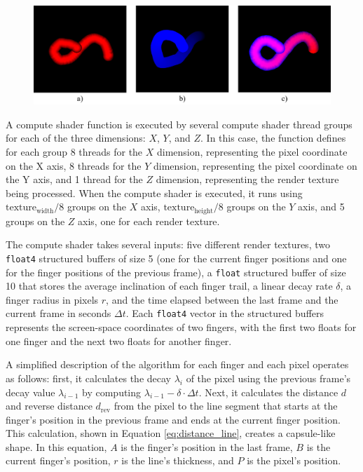         \begin{figure}[h!]
            \centering
            \includegraphics[width=1\textwidth]{figures/touch_progress.png}
            \label{fig:touch_progress}
        \end{figure}

        A compute shader function is executed by several compute shader thread groups for each of the three dimensions: \(X\), \(Y\), and \(Z\). In this case, the function defines for each group 8 threads for the \(X\) dimension, representing the pixel coordinate on the X axis, 8 threads for the \(Y\) dimension, representing the pixel coordinate on the Y axis, and 1 thread for the \(Z\) dimension, representing the render texture being processed. When the compute shader is executed, it runs using \(\text{texture}_{\text{width}} / 8\) groups on the \(X\) axis, \(\text{texture}_{\text{height}} / 8\) groups on the \(Y\) axis, and 5 groups on the \(Z\) axis, one for each render texture.

        The compute shader takes several inputs: five different render textures, two \lstinline{float4} structured buffers of size 5 (one for the current finger positions and one for the finger positions of the previous frame), a \lstinline{float} structured buffer of size 10 that stores the average inclination of each finger trail, a linear decay rate $\delta$, a finger radius in pixels $r$, and the time elapsed between the last frame and the current frame in seconds $\Delta t$. Each \lstinline{float4} vector in the structured buffers represents the screen-space coordinates of two fingers, with the first two floats for one finger and the next two floats for another finger.

        A simplified description of the algorithm for each finger and each pixel operates as follows: first, it calculates the decay \(\lambda_i\) of the pixel using the previous frame's decay value \(\lambda_{i-1}\) by computing \(\lambda_{i-1} - \delta \cdot \Delta t\). Next, it calculates the distance \(d\) and reverse distance $d_{\mathrm{rev}}$ from the pixel to the line segment that starts at the finger's position in the previous frame and ends at the current finger position. This calculation, shown in Equation \ref{eq:distance_line}, creates a capsule-like shape. In this equation, \(A\) is the finger's position in the last frame, \(B\) is the current finger's position, \(r\) is the line's thickness, and \(P\) is the pixel's position.


